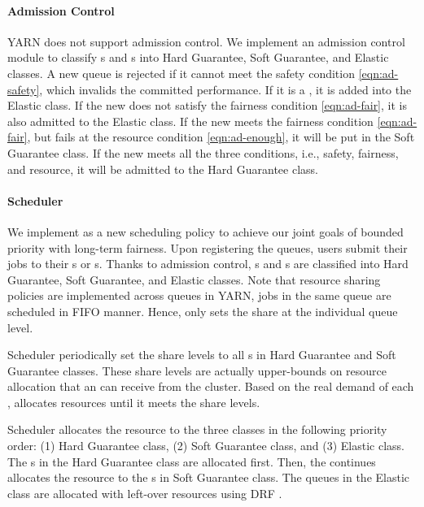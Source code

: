 \paragraph{Admission Control} YARN does not support admission control. 
We implement an admission control module to classify {\burstq}s and {\batchq}s into Hard Guarantee, Soft Guarantee, and Elastic classes. 
A new queue is rejected if it cannot meet the safety condition \eqref{eqn:ad-safety}, which invalids the committed performance.
If it is a \batchq, it is added into the Elastic class.
If the new {\burstq} does not satisfy the fairness condition \eqref{eqn:ad-fair}, it is also admitted to the Elastic class.
If the new {\burstq} meets the fairness condition \eqref{eqn:ad-fair}, but fails at the resource condition \eqref{eqn:ad-enough}, it will be put in the Soft Guarantee class.
If the new {\burstq} meets all the three conditions, i.e., safety, fairness, and resource, it will be admitted to the Hard Guarantee class.

\paragraph{\name Scheduler} We implement \name as a new scheduling policy to achieve our joint goals of bounded priority with long-term fairness. 
Upon registering the queues, users submit their jobs to their {\burstq}s or {\batchq}s. 
Thanks to admission control, {\burstq}s and {\batchq}s are classified into Hard Guarantee, Soft Guarantee, and Elastic classes. 
Note that resource sharing policies are implemented across queues in YARN, jobs in the same queue are scheduled in FIFO manner.
Hence, \name only sets the share at the individual queue level.

\name Scheduler periodically set the share levels to all {\burstq}s in Hard Guarantee and Soft Guarantee classes.
These share levels are actually upper-bounds on resource allocation that an {\burstq} can receive from the cluster. 
Based on the real demand of each {\burstq}, \name allocates resources until it meets the share levels. 

\name Scheduler allocates the resource to the three classes in the following priority order: (1) Hard Guarantee class, (2) Soft Guarantee class, and (3) Elastic class. 
The {\burstq}s in the Hard Guarantee class are allocated first.
Then, the \name continues allocates the resource to the {\burstq}s in Soft Guarantee class.
The queues in the Elastic class are allocated with left-over resources using DRF \cite{drf}.

